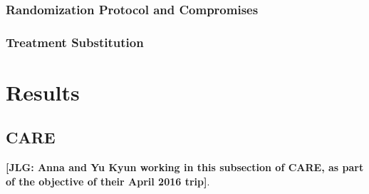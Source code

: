 \subsubsection{Randomization Protocol and Compromises}

\subsubsection{Treatment Substitution}

\section{Results}

\subsection{CARE}

\noindent \textbf{[JLG: Anna and Yu Kyun working in this subsection of CARE, as part of the objective of their April 2016 trip]}.

\renewcommand{\refname}{Appendix References}
\clearpage
\singlespace



 